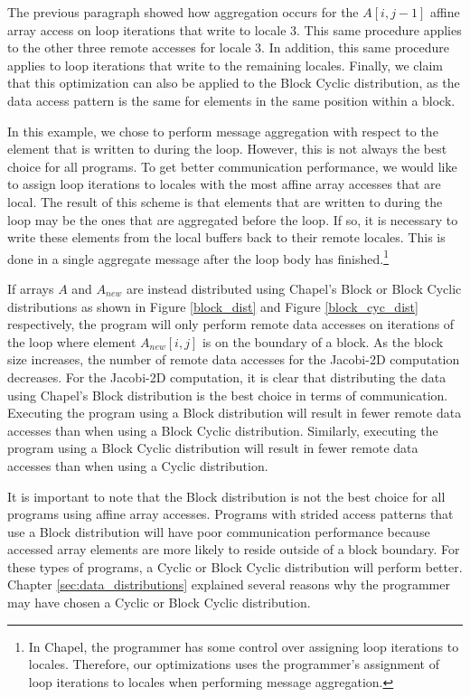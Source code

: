 The previous paragraph showed how aggregation occurs for the $A[i, j-1]$ affine array access on loop iterations that write to locale 3. This same procedure applies to the other three remote accesses for locale 3. In addition, this same procedure applies to loop iterations that write to the remaining locales. Finally, we claim that this optimization can also be applied to the Block Cyclic distribution, as the data access pattern is the same for elements in the same position within a block. 

In this example, we chose to perform message aggregation with respect to the element that is written to during the loop. However, this is not always the best choice for all programs. To get better communication performance, we would like to assign loop iterations to locales with the most affine array accesses that are local. The result of this scheme is that elements that are written to during the loop may be the ones that are aggregated before the loop. If so, it is necessary to write these elements from the local buffers back to their remote locales. This is done in a single aggregate message after the loop body has finished.\footnote{In Chapel, the programmer has some control over assigning loop iterations to locales. Therefore, our optimizations uses the programmer's assignment of loop iterations to locales when performing message aggregation.} 

If arrays $A$ and $A_{new}$ are instead distributed using Chapel's Block or Block Cyclic distributions as shown in Figure \ref{block_dist} and Figure \ref{block_cyc_dist} respectively, the program will only perform remote data accesses on iterations of the loop where element $A_{new}[i, j]$ is on the boundary of a block. As the block size increases, the number of remote data accesses for the Jacobi-2D computation decreases. For the Jacobi-2D computation, it is clear that distributing the data using Chapel's Block distribution is the best choice in terms of communication. Executing the program using a Block distribution will result in fewer remote data accesses than when using a Block Cyclic distribution. Similarly, executing the program using a Block Cyclic distribution will result in fewer remote data accesses than when using a Cyclic distribution. 

It is important to note that the Block distribution is not the best choice for all programs using affine array accesses. Programs with strided access patterns that use a Block distribution will have poor communication performance because accessed array elements are more likely to reside outside of a block boundary. For these types of programs, a Cyclic or Block Cyclic distribution will perform better. Chapter \ref{sec:data_distributions} explained several reasons why the programmer may have chosen a Cyclic or Block Cyclic distribution.

